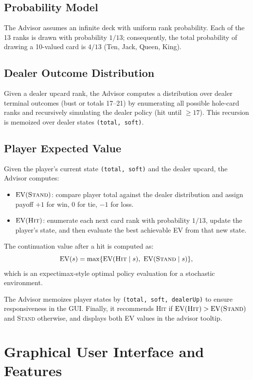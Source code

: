 \documentclass[conference]{IEEEtran}
\begin{document}
\subsection{Probability Model}
The Advisor assumes an infinite deck with uniform rank probability.
Each of the 13 ranks is drawn with probability $1/13$; consequently, the total probability of drawing a 10-valued card is $4/13$ (Ten, Jack, Queen, King).

\subsection{Dealer Outcome Distribution}
Given a dealer upcard rank, the Advisor computes a distribution over dealer terminal outcomes (bust or totals 17--21) by enumerating all possible hole-card ranks and recursively simulating the dealer policy (hit until $\ge 17$).
This recursion is memoized over dealer states \texttt{(total, soft)}.

\subsection{Player Expected Value}
Given the player's current state \texttt{(total, soft)} and the dealer upcard, the Advisor computes:
\begin{itemize}
  \item $\mathrm{EV}(\textsc{Stand})$: compare player total against the dealer distribution and assign payoff $+1$ for win, $0$ for tie, $-1$ for loss.
  \item $\mathrm{EV}(\textsc{Hit})$: enumerate each next card rank with probability $1/13$, update the player's state, and then evaluate the best achievable EV from that new state.
\end{itemize}
The continuation value after a hit is computed as:
\[
  \mathrm{EV}(s) = \max\{\mathrm{EV}(\textsc{Hit}\mid s),\ \mathrm{EV}(\textsc{Stand}\mid s)\},
\]
which is an expectimax-style optimal policy evaluation for a stochastic environment.

The Advisor memoizes player states by \texttt{(total, soft, dealerUp)} to ensure responsiveness in the GUI.
Finally, it recommends \textsc{Hit} if $\mathrm{EV}(\textsc{Hit}) > \mathrm{EV}(\textsc{Stand})$ and \textsc{Stand} otherwise, and displays both EV values in the advisor tooltip.

\section{Graphical User Interface and Features}
\end{document}
